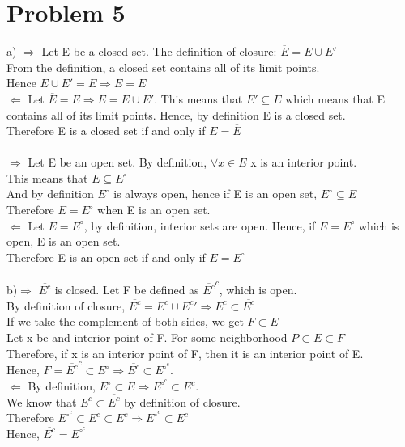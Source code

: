 \documentclass{article}
\begin{document}
 \section*{Problem 5}
 a) $\Rightarrow$ Let E be a closed set. The definition of closure: $\overline{E} = E \cup E'$
 \\From the definition, a closed set contains all of its limit points. 
 \\Hence $E \cup E' = E \Rightarrow \overline{E} = E$
 \\$\Leftarrow$ Let $\overline{E} = E \Rightarrow E = E \cup E'$. This means that $E' \subseteq E$ which means that E contains all of its limit points. Hence, by definition E is a closed set.
 \\Therefore E is a closed set if and only if $E = \overline{E}$
\\
 \\$\Rightarrow$ Let E be an open set. By definition, $\forall x \in E$ x is an interior point.
 \\This means that $E \subseteq E^\circ$
 \\And by definition $E^\circ$ is always open, hence if E is an open set, $E^\circ \subseteq E$
 \\Therefore $E = E^\circ$ when E is an open set.
 \\$\Leftarrow$ Let $E = E^\circ$, by definition, interior sets are open. Hence, if $E = E^\circ$ which is open, E is an open set.
 \\Therefore E is an open set if and only if $E = E^\circ$
 \\
 \\b)$\Rightarrow$ $\overline{E^c}$ is closed. Let F be defined as $\overline{E^c}^c$, which is open. 
 \\By definition of closure, $\overline{E^c} = E^c \cup E^c' \Rightarrow E^c \subset \overline{E^c}$
 \\If we take the complement of both sides, we get $F \subset E$
 \\Let x be and interior point of F. For some neighborhood $P \subset E \subset F$
 \\Therefore, if x is an interior point of F, then it is an interior point of E.
 \\Hence, $F = \overline{E^c}^c \subset E^\circ \Rightarrow \overline{E^c} \subset E^\circ^c$.
 \\$\Leftarrow$ By definition, $E^\circ \subset E \Rightarrow E^\circ^c \subset E^c$.
 \\We know that $E^c \subset \overline{E^c}$ by definition of closure.
 \\Therefore $E^\circ^c \subset E^c \subset \overline{E^c} \Rightarrow E^\circ^c \subset \overline{E^c}$
 \\Hence, $\overline{E^c} = E^\circ^c$
\end{document}
